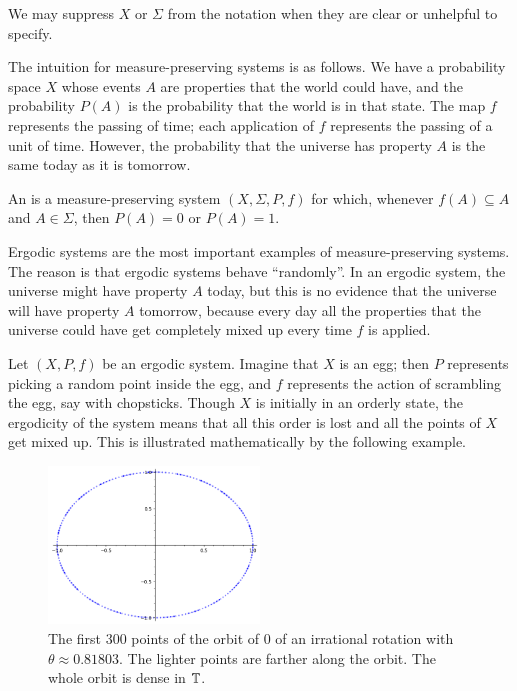 \begin{subsec}
We may suppress $X$ or $\Sigma$ from the notation when they are clear or unhelpful to specify.
\end{subsec}

\begin{subsec}
The intuition for measure-preserving systems is as follows.
We have a probability space $X$ whose events $A$ are properties that the world could have, and the probability $P(A)$ is the probability that the world is in that state.
The map $f$ represents the passing of time; each application of $f$ represents the passing of a unit of time.
However, the probability that the universe has property $A$ is the same today as it is tomorrow.
\end{subsec}

\begin{definition}
An  is a measure-preserving system $(X, \Sigma, P, f)$ for which, whenever $f(A) \subseteq A$ and $A \in \Sigma$, then $P(A) = 0$ or $P(A) = 1$.
\end{definition}

\begin{subsec}
Ergodic systems are the most important examples of measure-preserving systems.
The reason is that ergodic systems behave ``randomly''.
In an ergodic system, the universe might have property $A$ today, but this is no evidence that the universe will have property $A$ tomorrow, because every day all the properties that the universe could have get completely mixed up every time $f$ is applied.

Let $(X, P, f)$ be an ergodic system.
Imagine that $X$ is an egg; then $P$ represents picking a random point inside the egg, and $f$ represents the action of scrambling the egg, say with chopsticks.
Though $X$ is initially in an orderly state, the ergodicity of the system means that all this order is lost and all the points of $X$ get mixed up.
This is illustrated mathematically by the following example.
\end{subsec}

\begin{figure}
\label{irrationalRotationFig}
\caption{The first $300$ points of the orbit of $0$ of an irrational rotation with $\theta \approx 0.81803$. The lighter points are farther along the orbit. The whole orbit is dense in $\mathbb{T}$.}
\centering \includegraphics[width=0.5\textwidth]{graphics/irrationalRotationFig}
\end{figure}

